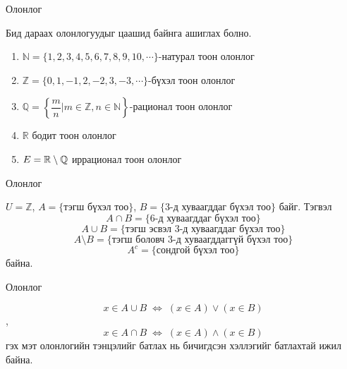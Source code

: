 \begin{frame}[allowframebreaks]{Олонлог}
\begin{remark} Бид дараах олонлогуудыг цаашид байнга ашиглах болно.
\begin{enumerate}
\item $\mathbb{N}=\{1, 2, 3, 4, 5, 6, 7, 8, 9, 10, \cdots \}$-натурал тоон олонлог
\item $\mathbb{Z}=\{0, 1, -1,  2, -2, 3, -3, \cdots \}$-бүхэл тоон олонлог
\item $\mathbb{Q}=\left\{\dfrac{m}{n}|m\in\mathbb{Z} , n\in\mathbb{N} \right\}$-рационал тоон олонлог
\item $\mathbb{R}$ бодит тоон олонлог
\item $E=\mathbb{R}\setminus \mathbb{Q}$ иррационал тоон олонлог
\end{enumerate}    
\end{remark}
\end{frame}

\begin{frame}[allowframebreaks]{Олонлог}
\begin{example}
   $U=\mathbb{Z}$, $A=\{ \text{тэгш бүхэл тоо}\}$, $B=\{ \text{3-д хуваагддаг бүхэл тоо}\}$ байг. Тэгвэл
$$A\cap B=\{ \text{6-д хуваагддаг бүхэл тоо}\}$$
$$A\cup B=\{ \text{тэгш эсвэл 3-д хуваагддаг бүхэл тоо}\}$$
$$A\setminus B=\{ \text{тэгш боловч 3-д хуваагддаггүй бүхэл тоо}\}$$
 $$A^c=\{ \text{сондгой бүхэл тоо}\}$$ байна.
\end{example}
\end{frame}

\begin{frame}[allowframebreaks]{Олонлог}
\begin{note}
$$x\in A\cup B \;\Leftrightarrow\; (x\in A)\lor(x\in B)$$,
$$x\in A\cap B \;\Leftrightarrow\; (x\in A)\land(x\in B)$$ 
гэх мэт олонлогийн тэнцэлийг батлах нь  бичигдсэн хэллэгийг батлахтай ижил байна.   
\end{note}
\end{frame}

